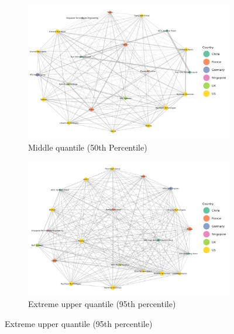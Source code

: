 \documentclass[
  letterpaper,
  DIV=11,
  numbers=noendperiod]{scrartcl}
\begin{document}
\begin{figure}

{\centering 

\begin{figure}[H]

{\centering \includegraphics[width=6.75in,height=\textheight]{plots/fig-rtn50.png}

}

\caption{Middle quantile (50th Percentile)}

\end{figure}

\begin{figure}[H]

{\centering \includegraphics[width=6.75in,height=\textheight]{plots/fig-rtn95.png}

}

\caption{Extreme upper quantile (95th percentile)}


\end{figure}}
\end{figure}
\end{document}
